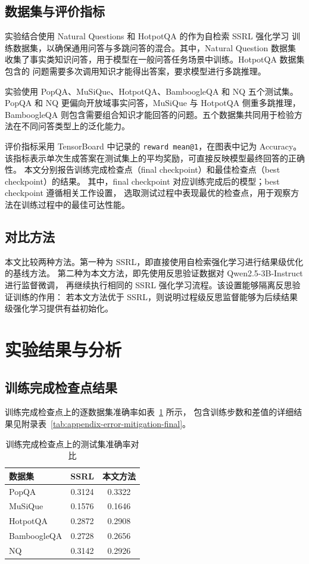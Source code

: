 \subsection{数据集与评价指标}

实验结合使用 Natural Questions 和 HotpotQA 的作为自检索 SSRL 强化学习
训练数据集，以确保通用问答与多跳问答的混合。其中，Natural Question 数据集
收集了事实类知识问答，用于模型在一般问答任务场景中训练。HotpotQA 数据集包含的
问题需要多次调用知识才能得出答案，要求模型进行多跳推理。

实验使用 PopQA、MuSiQue、HotpotQA、BamboogleQA 和 NQ 五个测试集。
PopQA 和 NQ 更偏向开放域事实问答，MuSiQue 与 HotpotQA 侧重多跳推理，
BamboogleQA 则包含需要组合知识才能回答的问题。五个数据集共同用于检验方法在不同问答类型上的泛化能力。

评价指标采用 TensorBoard 中记录的 \texttt{reward mean@1}，在图表中记为 Accuracy。
该指标表示单次生成答案在测试集上的平均奖励，可直接反映模型最终回答的正确性。
本文分别报告训练完成检查点（final checkpoint）和最佳检查点（best checkpoint）的结果。
其中，final checkpoint 对应训练完成后的模型；best checkpoint 遵循相关工作设置，
选取测试过程中表现最优的检查点，用于观察方法在训练过程中的最佳可达性能。

\subsection{对比方法}

本文比较两种方法。第一种为 SSRL，即直接使用自检索强化学习进行结果级优化的基线方法。
第二种为本文方法，即先使用反思验证数据对 Qwen2.5-3B-Instruct 进行监督微调，
再继续执行相同的 SSRL 强化学习流程。该设置能够隔离反思验证训练的作用：
若本文方法优于 SSRL，则说明过程级反思监督能够为后续结果级强化学习提供有益初始化。

\section{实验结果与分析}

\subsection{训练完成检查点结果}

训练完成检查点上的逐数据集准确率如表~\ref{tab:error-mitigation-final-main} 所示，
包含训练步数和差值的详细结果见附录表~\ref{tab:appendix-error-mitigation-final}。

\begin{table}[htbp]
\caption{训练完成检查点上的测试集准确率对比}
\label{tab:error-mitigation-final-main}
\vspace{0.5em}\centering\wuhao
\begin{tabular}{lcc}
\toprule
数据集 & SSRL & 本文方法 \\
\midrule
PopQA & 0.3124 & 0.3322 \\
MuSiQue & 0.1576 & 0.1646 \\
HotpotQA & 0.2872 & 0.2908 \\
BamboogleQA & 0.2728 & 0.2656 \\
NQ & 0.3142 & 0.2926 \\
\bottomrule
\end{tabular}
\end{table}

